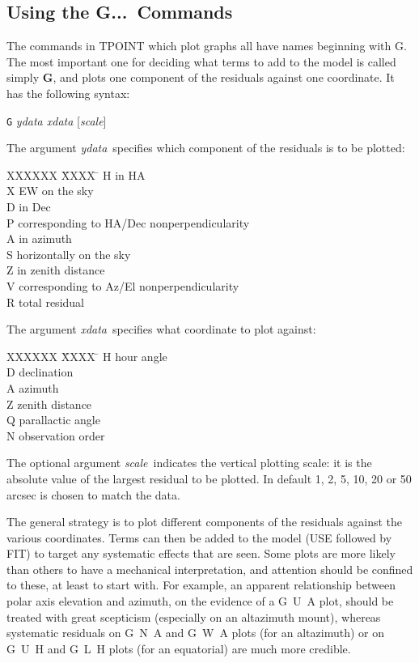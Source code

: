 \subsection{Using the G...\ Commands}
The commands in TPOINT which plot graphs all have names
beginning with G.  The most important one for
deciding what terms to add to the model is called simply {\bf G},
and plots one
component of the residuals against one coordinate.  It has the
following syntax:
\begin{cmnds}
\> \> {\tt G} {\it ydata xdata} [{\it scale}]
\end{cmnds}
The argument {\it ydata}\, specifies which component of the
residuals is to be plotted:
\begin{tabs}
XXXXXX \= XXXX \= \kill
\> H \> in HA \\
\> X \> EW on the sky \\
\> D \> in Dec \\
\> P \> corresponding to HA/Dec nonperpendicularity \\
\> A \> in azimuth \\
\> S \> horizontally on the sky \\
\> Z \> in zenith distance \\
\> V \> corresponding to Az/El nonperpendicularity \\
\> R \> total residual
\end{tabs}
The argument {\it xdata}\, specifies what coordinate to plot against:
\begin{tabs}
XXXXXX \= XXXX \= \kill
\> H \> hour angle \\
\> D \> declination \\
\> A \> azimuth \\
\> Z \> zenith distance \\
\> Q \> parallactic angle \\
\> N \> observation order
\end{tabs}
The optional argument {\it scale}\, indicates the vertical plotting
scale: it is the absolute value of the largest residual to be
plotted.  In default 1, 2, 5, 10, 20 or 50 arcsec is chosen to
match the data.

The general strategy is to plot different components of the residuals
against the various coordinates.  Terms can then be
added to the model (USE followed by FIT) to target
any systematic effects that are seen.  Some plots are more likely
than others to have a mechanical interpretation, and attention
should be confined to these, at least to start with.  For example,
an apparent relationship between polar axis elevation and azimuth,
on the evidence of a G~U~A plot, should be treated with great
scepticism (especially on an altazimuth mount), whereas systematic
residuals on G~N~A and G~W~A plots (for an altazimuth) or on
G~U~H and G~L~H plots (for an equatorial) are much more credible.

